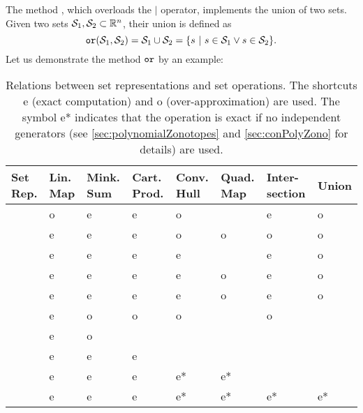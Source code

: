 \label{sec:or}

The method , which overloads the $|$ operator, implements the union of two sets. Given two sets $\mathcal{S}_1,\mathcal{S}_2 \subset \mathbb{R}^n$, their union is defined as 
\begin{equation*}
	{\normalfont \texttt{or}}(\mathcal{S}_1,\mathcal{S}_2) = \mathcal{S}_1 \cup \mathcal{S}_2 = \{ s ~|~ s \in \mathcal{S}_1 \vee s \in \mathcal{S}_2 \}.
\end{equation*}
Let us demonstrate the method ${\normalfont \texttt{or}}$ by an example:

\begin{center}
\begin{minipage}[t]{0.35\textwidth}
	\vspace{10pt}
	\footnotesize
	
\end{minipage}
\begin{minipage}[t]{0.6\textwidth}
	\vspace{0pt}
	\centering
\end{minipage}
\end{center}


\begin{table*}
\centering
	\caption{Relations between set representations and set operations. The shortcuts e (exact computation) and o (over-approximation) are used. The symbol e* indicates that the operation is exact if no independent generators (see \cref{sec:polynomialZonotopes} and \cref{sec:conPolyZono} for details) are used.}
	\label{tab:basicOperations}
	\begin{tabular}{ p{2.5cm} C{1.4cm} C{1.4cm} C{1.4cm} C{1.4cm} C{1.4cm} C{1.4cm} C{1.4cm}}
		 \toprule
		 \textbf{Set Rep.} & \textbf{Lin. Map} & \textbf{Mink. Sum} & \textbf{Cart. Prod.} & \textbf{Conv. Hull} & \textbf{Quad. Map} & \textbf{Inter- section} & \textbf{Union} \\
		 \midrule
		  & o & e & e & o &  & e & o \\
		  & e & e & e & o & o & o & o  \\
		  & e & e & e & e &  & e & o \\
		  & e & e & e & e & o & e & o \\
		  & e & e & e & e & o & e & o \\
		  & e  & o & o & o &  & o &  \\
		  & e & o & & & & & \\
		  & e & e & e & & & & \\
		  & e & e & e & e* & e* &  & \\
		  & e & e & e & e* & e* & e* & e* \\
		 \bottomrule
	\end{tabular}
\end{table*}

